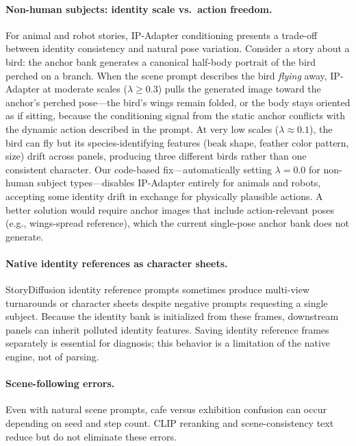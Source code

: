 \paragraph{Non-human subjects: identity scale vs.\ action freedom.}
For animal and robot stories, IP-Adapter conditioning presents a trade-off between identity consistency and natural pose variation. Consider a story about a bird: the anchor bank generates a canonical half-body portrait of the bird perched on a branch. When the scene prompt describes the bird \emph{flying} away, IP-Adapter at moderate scales ($\lambda \geq 0.3$) pulls the generated image toward the anchor's perched pose---the bird's wings remain folded, or the body stays oriented as if sitting, because the conditioning signal from the static anchor conflicts with the dynamic action described in the prompt. At very low scales ($\lambda \approx 0.1$), the bird can fly but its species-identifying features (beak shape, feather color pattern, size) drift across panels, producing three different birds rather than one consistent character. Our code-based fix---automatically setting $\lambda=0.0$ for non-human subject types---disables IP-Adapter entirely for animals and robots, accepting some identity drift in exchange for physically plausible actions. A better solution would require anchor images that include action-relevant poses (e.g., wings-spread reference), which the current single-pose anchor bank does not generate.

\paragraph{Native identity references as character sheets.}
StoryDiffusion identity reference prompts sometimes produce multi-view turnarounds or character sheets despite negative prompts requesting a single subject. Because the identity bank is initialized from these frames, downstream panels can inherit polluted identity features. Saving identity reference frames separately is essential for diagnosis; this behavior is a limitation of the native engine, not of parsing.

\paragraph{Scene-following errors.}
Even with natural scene prompts, cafe versus exhibition confusion can occur depending on seed and step count. CLIP reranking and scene-consistency text reduce but do not eliminate these errors.

